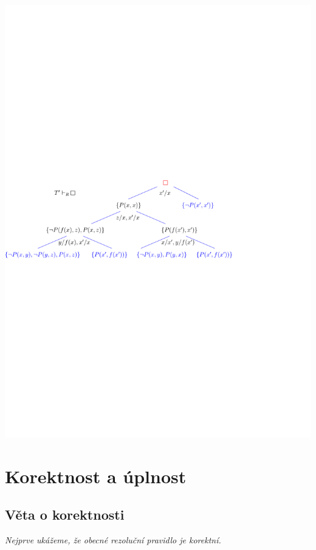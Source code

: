     \vspace{-2mm}
    \centerline{\includegraphics[scale=0.8]{files/rezolucePLpriklad}}
    
    


\section{Korektnost a úplnost}\todo



\subsection{Věta o korektnosti}\todo

{\it Nejprve ukážeme, že obecné rezoluční pravidlo je korektní.}
\medskip

